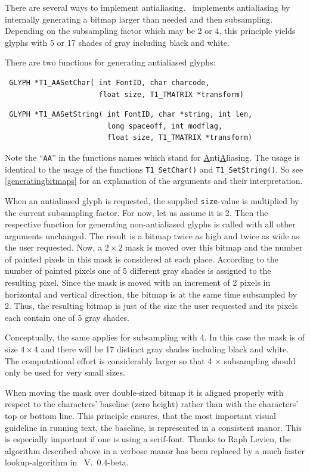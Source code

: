 There are several ways to implement antialiasing. \tonelib\ implements
antialiasing by internally generating a bitmap larger than needed
and then subsampling. Depending on the subsampling factor which may be 2 or 4,
this principle yields glyphs with
5 or 17 shades of gray including black and white. 

There are two functions for generating antialiased glyphs:
\precorr
\begin{verbatim}
 GLYPH *T1_AASetChar( int FontID, char charcode, 
                      float size, T1_TMATRIX *transform)
\end{verbatim}\postcorr
\precorr
\begin{verbatim}
 GLYPH *T1_AASetString( int FontID, char *string, int len, 
                        long spaceoff, int modflag, 
                        float size, T1_TMATRIX *transform)
\end{verbatim}\postcorr
Note the ``\verb+AA+'' in the functions names which stand for
\underline{A}nti\underline{A}liasing. The usage is identical to the usage of
the functions \verb+T1_SetChar()+ and \verb+T1_SetString()+. So see
\ref{generatingbitmaps} for an explanation of the arguments and their
interpretation.  

When an antialiased glyph is requested, the supplied \verb+size+-value is
multiplied by the current subsampling factor. For now, let us assume it is 2.
Then the respective function for generating non-antialiased glyphs
is called with all other arguments unchanged. The result is a bitmap twice as
high and twice as wide as the user requested. Now, a $2\times2$ mask is moved
over this bitmap and the number of painted pixels in this mask is considered
at each place. According to the number of painted pixels one of 5 different
gray shades is assigned to the resulting pixel. Since the mask is moved with
an increment of 2 pixels in horizontal and vertical direction, the bitmap is
at the same time subsampled by 2. Thus, the resulting bitmap is just of the
size the user requested and its pixels each contain one of 5 gray shades. 

Conceptually, the same applies for subsampling with 4. In this case the mask is
of size $4\times4$ and there will be 17 distinct gray shades including black
and white. The computational effort is considerably larger so that 4 $\times$
subsampling should only be used for very small sizes. 

When moving the mask over double-sized bitmap it is aligned properly with
respect to the characters' baseline (zero height) rather than with the
characters' top or bottom line. This principle ensures, that the most important
visual guideline in running text, the baseline, is represented in a consistent
manor. This is especially important if one is using a serif-font.
Thanks to Raph Levien, the algorithm described above in a verbose manor has
been replaced by a much 
faster lookup-algorithm in \tonelib\ V.\ 0.4-beta.

